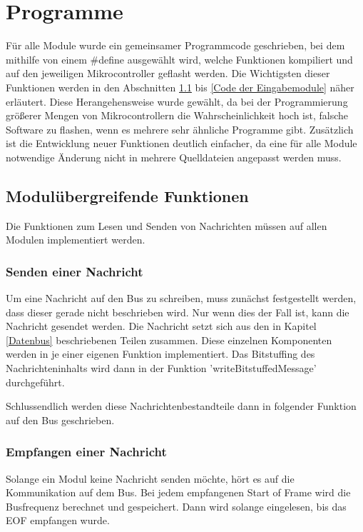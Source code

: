 \section{Programme}
Für alle Module wurde ein gemeinsamer Programmcode geschrieben, bei dem mithilfe von einem \#define ausgewählt wird, welche Funktionen kompiliert und auf den jeweiligen Mikrocontroller geflasht werden. Die Wichtigsten dieser Funktionen werden in den Abschnitten \ref{Modulübergreifende Funktionen} bis \ref{Code der Eingabemodule} näher erläutert. Diese Herangehensweise wurde gewählt, da bei der Programmierung größerer Mengen von Mikrocontrollern die Wahrscheinlichkeit hoch ist, falsche Software zu flashen, wenn es mehrere sehr ähnliche Programme gibt. Zusätzlich ist die Entwicklung neuer Funktionen deutlich einfacher, da eine für alle Module notwendige Änderung nicht in mehrere Quelldateien angepasst werden muss.

\subsection{Modulübergreifende Funktionen}
\label{Modulübergreifende Funktionen}
Die Funktionen zum Lesen und Senden von Nachrichten müssen auf allen Modulen implementiert werden.

\subsubsection{Senden einer Nachricht}
Um eine Nachricht auf den Bus zu schreiben, muss zunächst festgestellt werden, dass dieser gerade nicht beschrieben wird. Nur wenn dies der Fall ist, kann die Nachricht gesendet werden. Die Nachricht setzt sich aus den in Kapitel \ref{Datenbus} beschriebenen Teilen zusammen. Diese einzelnen Komponenten werden in je einer eigenen Funktion implementiert. Das Bitstuffing des Nachrichteninhalts wird dann in der Funktion 'writeBitstuffedMessage' durchgeführt.



Schlussendlich werden diese Nachrichtenbestandteile dann in folgender Funktion auf den Bus geschrieben.




\subsubsection{Empfangen einer Nachricht}
Solange ein Modul keine Nachricht senden möchte, hört es auf die Kommunikation auf dem Bus. Bei jedem empfangenen Start of Frame wird die Busfrequenz berechnet und gespeichert. Dann wird solange eingelesen, bis das EOF empfangen wurde. 

